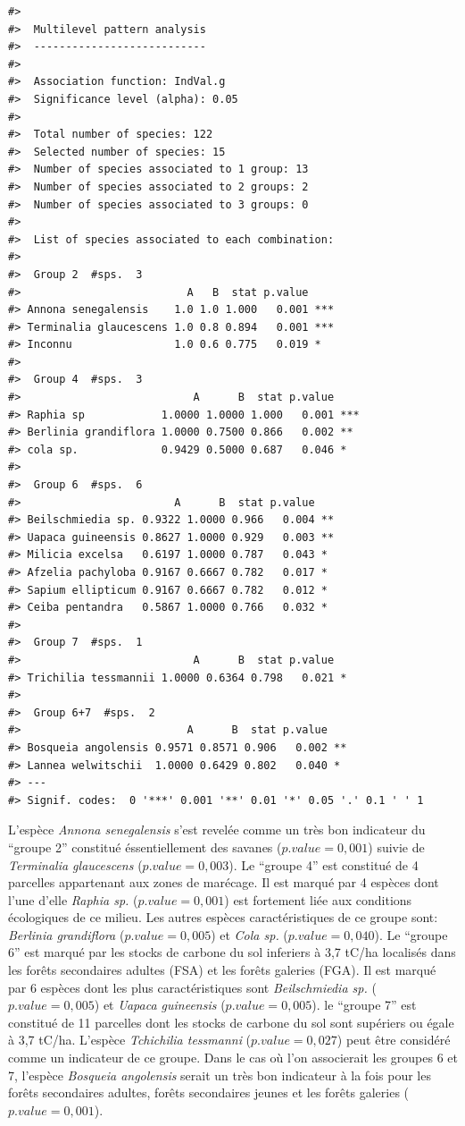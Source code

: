 \documentclass[
  12pt,
  a4paper,
  extrafontsizes,
  onecolumn,
  openright]{book}
\theoremstyle{definition}
\theoremstyle{definition}
\theoremstyle{definition}
\theoremstyle{definition}
\theoremstyle{remark}
\begin{document}
\begin{verbatim}
#> 
#>  Multilevel pattern analysis
#>  ---------------------------
#> 
#>  Association function: IndVal.g
#>  Significance level (alpha): 0.05
#> 
#>  Total number of species: 122
#>  Selected number of species: 15 
#>  Number of species associated to 1 group: 13 
#>  Number of species associated to 2 groups: 2 
#>  Number of species associated to 3 groups: 0 
#> 
#>  List of species associated to each combination: 
#> 
#>  Group 2  #sps.  3 
#>                          A   B  stat p.value    
#> Annona senegalensis    1.0 1.0 1.000   0.001 ***
#> Terminalia glaucescens 1.0 0.8 0.894   0.001 ***
#> Inconnu                1.0 0.6 0.775   0.019 *  
#> 
#>  Group 4  #sps.  3 
#>                           A      B  stat p.value    
#> Raphia sp            1.0000 1.0000 1.000   0.001 ***
#> Berlinia grandiflora 1.0000 0.7500 0.866   0.002 ** 
#> cola sp.             0.9429 0.5000 0.687   0.046 *  
#> 
#>  Group 6  #sps.  6 
#>                        A      B  stat p.value   
#> Beilschmiedia sp. 0.9322 1.0000 0.966   0.004 **
#> Uapaca guineensis 0.8627 1.0000 0.929   0.003 **
#> Milicia excelsa   0.6197 1.0000 0.787   0.043 * 
#> Afzelia pachyloba 0.9167 0.6667 0.782   0.017 * 
#> Sapium ellipticum 0.9167 0.6667 0.782   0.012 * 
#> Ceiba pentandra   0.5867 1.0000 0.766   0.032 * 
#> 
#>  Group 7  #sps.  1 
#>                           A      B  stat p.value  
#> Trichilia tessmannii 1.0000 0.6364 0.798   0.021 *
#> 
#>  Group 6+7  #sps.  2 
#>                          A      B  stat p.value   
#> Bosqueia angolensis 0.9571 0.8571 0.906   0.002 **
#> Lannea welwitschii  1.0000 0.6429 0.802   0.040 * 
#> ---
#> Signif. codes:  0 '***' 0.001 '**' 0.01 '*' 0.05 '.' 0.1 ' ' 1
\end{verbatim}

L'espèce \emph{Annona senegalensis} s'est revelée comme un très bon indicateur du \enquote{groupe 2} constitué éssentiellement des savanes (\(p.value=0,001\)) suivie de \emph{Terminalia glaucescens} (\(p.value=0,003\)). Le \enquote{groupe 4} est constitué de 4 parcelles appartenant aux zones de marécage. Il est marqué par 4 espèces dont l'une d'elle \emph{Raphia sp.} (\(p.value=0,001\)) est fortement liée aux conditions écologiques de ce milieu. Les autres espèces caractéristiques de ce groupe sont: \emph{Berlinia grandiflora} (\(p.value=0,005\)) et \emph{Cola sp.} (\(p.value=0,040\)). Le \enquote{groupe 6} est marqué par les stocks de carbone du sol inferiers à 3,7 tC/ha localisés dans les forêts secondaires adultes (FSA) et les forêts galeries (FGA). Il est marqué par 6 espèces dont les plus caractéristiques sont \emph{Beilschmiedia sp.} (\(p.value=0,005\)) et \emph{Uapaca guineensis} (\(p.value=0,005\)). le \enquote{groupe 7} est constitué de 11 parcelles dont les stocks de carbone du sol sont supériers ou égale à 3,7 tC/ha. L'espèce \emph{Tchichilia tessmanni} (\(p.value=0,027\)) peut être considéré comme un indicateur de ce groupe. Dans le cas où l'on associerait les groupes 6 et 7, l'espèce \emph{Bosqueia angolensis} serait un très bon indicateur à la fois pour les forêts secondaires adultes, forêts secondaires jeunes et les forêts galeries (\(p.value=0,001\)).
\end{document}
